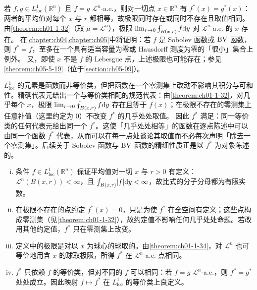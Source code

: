 \documentclass[../../main.tex]{subfiles}%
\begin{document}
\begin{remark}\label{remark:ch01-def-1-26-精确代表}
若 $f,g\in L^{1}_{\mathrm{loc}}(\mathbb{R}^n)$ 且 $f=g$ $\mathcal{L}^{n}$-a.e.，则对一切点 $x\in\mathbb{R}^n$ 有 $f^{*}(x)=g^{*}(x)$：两者的平均值对每个 $x$ 与 $r$ 都相等，故极限同时存在或同时不存在且取值相同。由\cref{theorem:ch01-1-32}（取 $\mu=\mathcal{L}^{n}$），极限 $\lim_{r\to0}\fint_{B(x,r)}f\diff y$ 对 $\mathcal{L}^{n}$-a.e. 的 $x$ 存在。%
在\cref{chapter:ch04,chapter:ch05}中将证明：若 $f$ 是 Sobolev 函数或 $\mathrm{BV}$ 函数，则 $f^{*}=f$，至多在一个具有适当容量为零或 Hausdorff 测度为零的「很小」集合上例外。%
又，即使 $x$ 不是 $f$ 的 Lebesgue 点，上述极限也可能存在；参见\cref{theorem:ch05-5-19}（位于\cref{section:ch05-09}）。%
\end{remark}

\begin{remark}\label{remark:ch01-def-1-26-动机}
$L^{1}_{\mathrm{loc}}$ 的元素是函数而非等价类，但把函数在一个零测集上改动不影响其积分与可和性。精确代表元给出一个与等价类相配的规范代表：由\cref{theorem:ch01-1-32}，对几乎每个 $x$，极限 $\lim_{r\to0}\fint_{B(x,r)}f\diff y$ 存在且等于 $f(x)$；在极限不存在的零测集上任意补值（这里约定为 $0$）不改变 $f^{*}$ 的几乎处处取值。%
因此 $f^{*}$ 满足：同一等价类的任何代表元给出同一个 $f^{*}$。这使「几乎处处相等」的函数在逐点陈述中可以由同一个函数 $f^{*}$ 代表，从而可以在每一点处谈论其取值而不必每次声明「除去一个零测集」。后续关于 Sobolev 函数与 $\mathrm{BV}$ 函数的精细性质正是以 $f^{*}$ 为对象陈述的。
\end{remark}

\begin{remark}\label{remark:ch01-def-1-26-条件}
\begin{enumerate}[(i)]
\item 条件 $f\in L^{1}_{\mathrm{loc}}(\mathbb{R}^n)$ 保证平均值对一切 $x$ 与 $r>0$ 有定义：$\mathcal{L}^{n}(B(x,r))<\infty$，且 $\int_{B(x,r)}\lvert f\rvert\mathrm{d} y<\infty$，故比式的分子分母都为有限实数。
\item 在极限不存在的点约定 $f^{*}(x)=0$，只是为使 $f^{*}$ 在全空间有定义；这些点构成零测集（见\cref{theorem:ch01-1-32}），故约定值不影响任何几乎处处命题。若改用其他约定值，$f^{*}$ 只在零测集上改变。%
\item 定义中的极限是对以 $x$ 为球心的球取的。由\cref{theorem:ch01-1-34}，对 $\mathcal{L}^{n}$ 也可等价地用含 $x$ 的球取极限，所得 $f^{*}$ 在 $\mathcal{L}^{n}$-a.e. 点相同。%
\item $f^{*}$ 只依赖 $f$ 的等价类，但对不同的 $f$ 可以相同：若 $f=g$ $\mathcal{L}^{n}$-a.e.，则 $f^{*}=g^{*}$ 处处成立。因此映射 $f\mapsto f^{*}$ 在 $L^{1}_{\mathrm{loc}}$ 的等价类上良定义。
\end{enumerate}
\end{remark}
\end{document}

